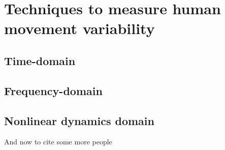 \chapter{Techniques to measure human movement variability}

\ifpdf
    \graphicspath{{chapter3/figs/raster/}{chapter3/figs/PDF/}{chapter3/figs/}}
\else
    \graphicspath{{chapter3/figs/vector/}{chapter3/figs/}}
\fi


\section{Time-domain}
\section{Frequency-domain}
\section{Nonlinear dynamics domain}
And now to cite some more people~\citet{Rea85,Ancey1996}
